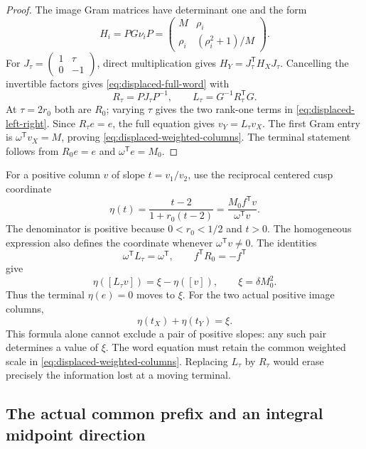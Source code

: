 \begin{proof}
The image Gram matrices have determinant one and the form
$$
 H_i=PG\nu_iP=
 \begin{pmatrix}M&\rho_i\\\rho_i&(\rho_i^2+1)/M\end{pmatrix}.
$$
For $J_\tau=\left(\begin{smallmatrix}1&\tau\\0&-1\end{smallmatrix}\right)$, direct multiplication gives $H_Y=J_\tau^{\mathsf T}H_XJ_\tau$. Cancelling the invertible factors gives \eqref{eq:displaced-full-word} with
$$
 R_\tau=PJ_\tau P^{-1},\qquad L_\tau=G^{-1}R_\tau^{\mathsf T}G.
$$
At $\tau=2r_0$ both are $R_0$; varying $\tau$ gives the two rank-one terms in \eqref{eq:displaced-left-right}. Since $R_\tau e=e$, the full equation gives $v_Y=L_\tau v_X$. The first Gram entry is $\omega^{\mathsf T}v_X=M$, proving \eqref{eq:displaced-weighted-columns}. The terminal statement follows from $R_0e=e$ and $\omega^{\mathsf T}e=M_0$.
\end{proof}

For a positive column $v$ of slope $t=v_1/v_2$, use the reciprocal centered cusp coordinate
\begin{equation}
 \eta(t)=\frac{t-2}{1+r_0(t-2)}
 =\frac{M_0f^{\mathsf T}v}{\omega^{\mathsf T}v}.
 \label{eq:displaced-eta}
\end{equation}
The denominator is positive because $0<r_0<1/2$ and $t>0$. The homogeneous expression also defines the coordinate whenever $\omega^{\mathsf T}v\ne0$. The identities
$$
 \omega^{\mathsf T}L_\tau=\omega^{\mathsf T},\qquad
 f^{\mathsf T}R_0=-f^{\mathsf T}
$$
give
\begin{equation}
 \eta([L_\tau v])=\xi-\eta([v]),\qquad
 \xi=\delta M_0^2.
 \label{eq:displaced-terminal}
\end{equation}
Thus the terminal $\eta(e)=0$ moves to $\xi$. For the two actual positive image columns,
$$
 \eta(t_X)+\eta(t_Y)=\xi.
$$
This formula alone cannot exclude a pair of positive slopes: any such pair determines a value of $\xi$. The word equation must retain the common weighted scale in \eqref{eq:displaced-weighted-columns}. Replacing $L_\tau$ by $R_\tau$ would erase precisely the information lost at a moving terminal.

\subsection{The actual common prefix and an integral midpoint direction}

